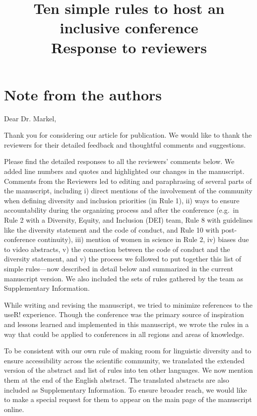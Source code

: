 \documentclass{article}
\title{Ten simple rules to host an inclusive conference\\ \vspace{0.5cm}
\textbf{Response to reviewers}}
\author{}
\date{}
\begin{document}
\maketitle

\section*{Note from the authors}

Dear Dr. Markel, 

Thank you for considering our article for publication. We would like to thank the reviewers for their detailed feedback and thoughtful comments and suggestions.

Please find the detailed responses to all the reviewers' comments below. We added line numbers and quotes and highlighted our changes in the manuscript. 
Comments from the Reviewers led to editing and paraphrasing of several parts of the manuscript, including
i) direct mentions of the involvement of the community when defining diversity and inclusion priorities (in Rule 1),
ii) ways to ensure accountability during the organizing process and after the conference (e.g.\ in Rule 2 with a Diversity, Equity, and Inclusion (DEI) team, Rule 8 with guidelines like the diversity statement and the code of conduct, and Rule 10 with post-conference continuity),
iii) mention of women in science in Rule 2,
iv) biases due to video abstracts, 
v) the connection between the code of conduct and the diversity statement, and
v) the process we followed to put together this list of simple rules---now described in detail below and summarized in the current manuscript version. We also included the sets of rules gathered by the team as Supplementary Information. 

While writing and revising the manuscript, we tried to minimize references to the useR! experience. Though the conference was the primary source of inspiration and lessons learned and implemented in this manuscript, we wrote the rules in a way that could be applied to conferences in all regions and areas of knowledge. 

To be consistent with our own rule of making room for linguistic diversity and to ensure accessibility across the scientific community, we translated the extended version of the abstract and list of rules into ten other languages. We now mention them at the end of the English abstract. The translated abstracts are also included as Supplementary Information. To ensure broader reach, we would like to make a special request for them to appear on the main page of the manuscript online.
\end{document}
